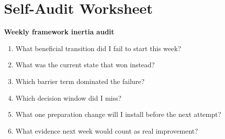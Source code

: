 \section{Self-Audit Worksheet}

\begin{templatebox}
\textbf{Weekly framework inertia audit}
\begin{enumerate}[nosep]
  \item What beneficial transition did I fail to start this week?
  \item What was the current state that won instead?
  \item Which barrier term dominated the failure?
  \item Which decision window did I miss?
  \item What one preparation change will I install before the next attempt?
  \item What evidence next week would count as real improvement?
\end{enumerate}
\end{templatebox}

